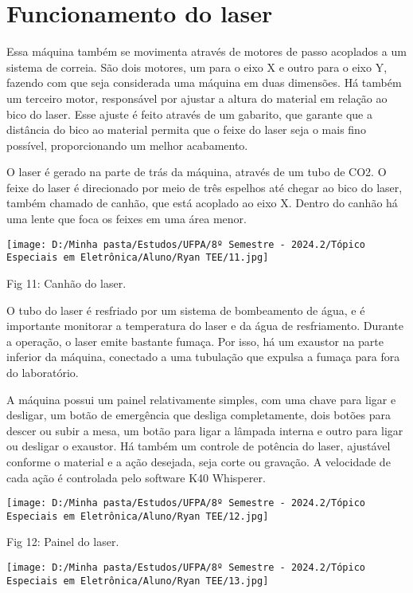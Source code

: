 \documentclass[
]{book}
\begin{document}
\section{Funcionamento do laser}\label{funcionamento-do-laser}

Essa máquina também se movimenta através de motores de passo acoplados a um sistema de correia. São dois motores, um para o eixo X e outro para o eixo Y, fazendo com que seja considerada uma máquina em duas dimensões. Há também um terceiro motor, responsável por ajustar a altura do material em relação ao bico do laser. Esse ajuste é feito através de um gabarito, que garante que a distância do bico ao material permita que o feixe do laser seja o mais fino possível, proporcionando um melhor acabamento.

O laser é gerado na parte de trás da máquina, através de um tubo de CO2. O feixe do laser é direcionado por meio de três espelhos até chegar ao bico do laser, também chamado de canhão, que está acoplado ao eixo X. Dentro do canhão há uma lente que foca os feixes em uma área menor.

\texttt{[image: D:/Minha pasta/Estudos/UFPA/8º Semestre - 2024.2/Tópico Especiais em Eletrônica/Aluno/Ryan TEE/11.jpg]}

Fig 11: Canhão do laser.

O tubo do laser é resfriado por um sistema de bombeamento de água, e é importante monitorar a temperatura do laser e da água de resfriamento. Durante a operação, o laser emite bastante fumaça. Por isso, há um exaustor na parte inferior da máquina, conectado a uma tubulação que expulsa a fumaça para fora do laboratório.

A máquina possui um painel relativamente simples, com uma chave para ligar e desligar, um botão de emergência que desliga completamente, dois botões para descer ou subir a mesa, um botão para ligar a lâmpada interna e outro para ligar ou desligar o exaustor. Há também um controle de potência do laser, ajustável conforme o material e a ação desejada, seja corte ou gravação. A velocidade de cada ação é controlada pelo software K40 Whisperer.

\texttt{[image: D:/Minha pasta/Estudos/UFPA/8º Semestre - 2024.2/Tópico Especiais em Eletrônica/Aluno/Ryan TEE/12.jpg]}

Fig 12: Painel do laser.

\texttt{[image: D:/Minha pasta/Estudos/UFPA/8º Semestre - 2024.2/Tópico Especiais em Eletrônica/Aluno/Ryan TEE/13.jpg]}
\end{document}
